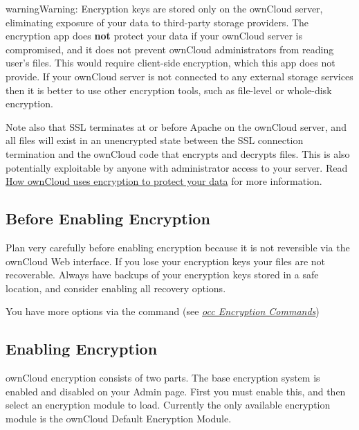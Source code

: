 \documentclass[letterpaper,10pt,english]{sphinxmanual}
\begin{document}
\begin{notice}{warning}{Warning:}
Encryption keys are stored only on the ownCloud server, eliminating
exposure of your data to third-party storage providers. The encryption app
does \textbf{not} protect your data if your ownCloud server is compromised, and it
does not prevent ownCloud administrators from reading user's files. This
would require client-side encryption, which this app does not provide. If
your ownCloud server is not connected to any external storage services then
it is better to use other encryption tools, such as file-level or
whole-disk encryption.

Note also that SSL terminates at or before Apache on the ownCloud server, and
all files will exist in an unencrypted state between the SSL connection
termination and the ownCloud code that encrypts and decrypts files. This is
also potentially exploitable by anyone with administrator access to your
server. Read \href{https://owncloud.org/blog/how-owncloud-uses-encryption-to-protect-your-data/}{How ownCloud uses encryption to protect your data} for more information.
\end{notice}


\subsection{Before Enabling Encryption}
\label{configuration_files/encryption_configuration:before-enabling-encryption}
Plan very carefully before enabling encryption because it is not reversible via
the ownCloud Web interface. If you lose your encryption keys your files are not
recoverable. Always have backups of your encryption keys stored in a safe
location, and consider enabling all recovery options.

You have more options via the  command (see {\hyperref[configuration_files/encryption_configuration:occ-encryption-label]{\emph{occ Encryption Commands}}})


\subsection{Enabling Encryption}
\label{configuration_files/encryption_configuration:enabling-encryption}\label{configuration_files/encryption_configuration:enable-encryption-label}
ownCloud encryption consists of two parts. The base encryption system is
enabled and disabled on your Admin page. First you must enable this, and then
select an encryption module to load. Currently the only available encryption
module is the ownCloud Default Encryption Module.
\end{document}
